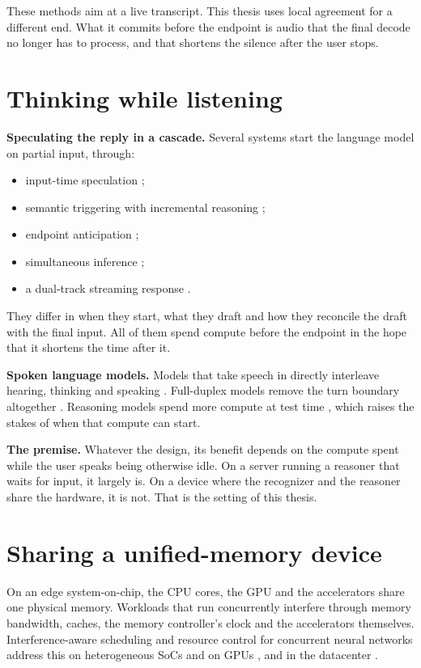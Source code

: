 These methods aim at a live transcript. This thesis uses local agreement for a
different end. What it commits before the endpoint is audio that the final
decode no longer has to process, and that shortens the silence after the user
stops.

\section{Thinking while listening}
\label{sec:twl}

\textbf{Speculating the reply in a cascade.} Several systems start the
language model on partial input, through:
\begin{itemize}
\item input-time speculation \cite{predgen2025};
\item semantic triggering with incremental reasoning \cite{ltsvoiceagent2026};
\item endpoint anticipation \cite{epa2026};
\item simultaneous inference \cite{livemind2024};
\item a dual-track streaming response \cite{ddtsr2026}.
\end{itemize}
They differ in when they start, what they draft and how they reconcile the
draft with the final input. All of them spend compute before the endpoint in
the hope that it shortens the time after it.

\textbf{Spoken language models.} Models that take speech in directly
interleave hearing, thinking and speaking
\cite{shanks2025,stitch2026,miniomnireasoner2025,chronothink2026,shih2025thinklisten}.
Full-duplex models remove the turn boundary altogether
\cite{moshi2024,lws2026}. Reasoning models spend more compute at test time
\cite{s1_2025}, which raises the stakes of when that compute can start.

\textbf{The premise.} Whatever the design, its benefit depends on the compute
spent while the user speaks being otherwise idle. On a server
running a reasoner that waits for input, it largely is. On a device where the
recognizer and the reasoner share the hardware, it is not. That is the
setting of this thesis.

\section{Sharing a unified-memory device}
\label{sec:shared}

On an edge system-on-chip, the CPU cores, the GPU and the accelerators share
one physical memory. Workloads that run concurrently interfere through memory
bandwidth, caches, the memory controller's clock and the accelerators
themselves. Interference-aware scheduling and resource control for
concurrent neural networks address this on heterogeneous SoCs and on GPUs
\cite{haxconn2024,aliyun2018bwlock,kim2024interference,kang2026emcgovernor,sgdrc2025,quilt2026},
and in the datacenter \cite{prophet2017,igniter2022}.

